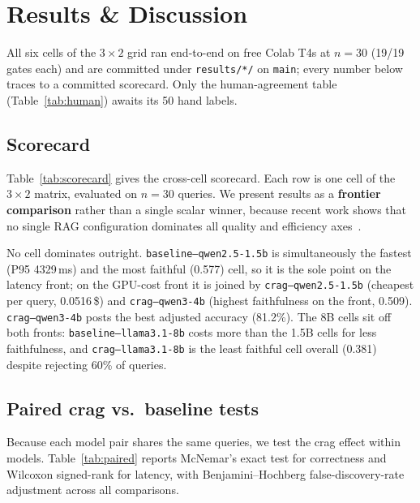 
\section{Results \& Discussion}
\label{sec:results}

All six cells of the $3 \times 2$ grid ran end-to-end on free Colab T4s at
$n=30$ (19/19 gates each) and are committed under \texttt{results/*/} on
\texttt{main}; every number below traces to a committed scorecard. Only the
human-agreement table (Table~\ref{tab:human}) awaits its 50 hand labels.

\subsection{Scorecard}

Table~\ref{tab:scorecard} gives the cross-cell scorecard. Each row is one
cell of the $3 \times 2$ matrix, evaluated on $n=30$ queries. We present
results as a \textbf{frontier comparison} rather than a single scalar
winner, because recent work shows that no single RAG configuration
dominates all quality and efficiency axes~\cite{sharma2025survey,brown2025systematic}.



No cell dominates outright. \texttt{baseline--qwen2.5-1.5b} is simultaneously
the fastest (P95 4329\,ms) and the most faithful (0.577) cell, so it is the
sole point on the latency front; on the GPU-cost front it is joined by
\texttt{crag--qwen2.5-1.5b} (cheapest per query, 0.0516\,\$) and
\texttt{crag--qwen3-4b} (highest faithfulness on the front, 0.509).
\texttt{crag--qwen3-4b} posts the best adjusted accuracy (81.2\%). The
8B cells sit off both fronts: \texttt{baseline--llama3.1-8b} costs more than
the 1.5B cells for less faithfulness, and \texttt{crag--llama3.1-8b} is the
least faithful cell overall (0.381) despite rejecting 60\% of queries.

\subsection{Paired crag vs.\ baseline tests}

Because each model pair shares the same queries, we test the crag effect
within models. Table~\ref{tab:paired} reports McNemar's exact test for
correctness and Wilcoxon signed-rank for latency, with Benjamini--Hochberg
false-discovery-rate adjustment across all comparisons.


